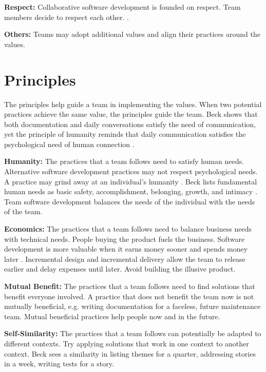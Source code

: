 \textbf{Respect:} Collaborative software development is founded on respect. Team members decide to respect each other.  \cite{BeckExtremeProgramming2004}.

\textbf{Others:} Teams may adopt additional values and align their practices around the values. 

\section{Principles}
The principles help guide a team in implementing the values. When two potential practices achieve the same value,  the principles guide the team. Beck shows that both documentation and daily conversations satisfy the need of communication, yet the principle of humanity reminds that daily communication satisfies the psychological need of human connection \cite{BeckExtremeProgramming2004}.

\textbf{Humanity:} The practices that a team follows need to satisfy human needs. Alternative software development practices may not respect psychological needs. A practice may grind away at an individual's humanity \cite{BeckExtremeProgramming2004}. Beck lists fundamental human needs as basic safety, accomplishment, belonging, growth, and intimacy \cite{BeckExtremeProgramming2004}. Team software development balances the needs of the individual with the needs of the team. 

\textbf{Economics:} The practices that a team follows need to balance business needs with technical needs\quotes. People buying the product fuels the business. {Software development is more valuable when it earns money sooner and spends money later} \cite{BeckExtremeProgramming2004}. Incremental design and incremental delivery allow the team to release earlier and delay expenses until later. Avoid building the illusive  product.

\textbf{Mutual Benefit:} The practices that a team follows need to find solutions that benefit everyone involved. A practice that does not benefit the team now is not mutually beneficial, e.g. writing documentation for a faceless, future maintenance team. Mutual beneficial practices help people now and in the future. 


\textbf{Self-Similarity:} The practices that a team follows can potentially be adapted to different contexts. Try applying solutions that work in one context to another context. Beck sees a similarity in listing themes for a quarter, addressing stories in a week, writing tests for a story.

